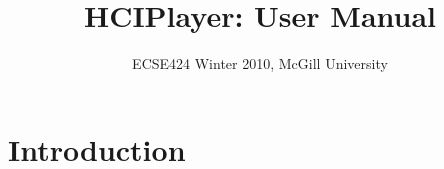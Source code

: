 \documentclass[10pt,letterpaper]{article}
\begin{document}
\title{HCIPlayer: User Manual}
\author{ECSE424 Winter 2010, McGill University}
\renewcommand{\today}{Updated: Monday, March 8th, 2010}
\maketitle

\section{Introduction}
\end{document}
